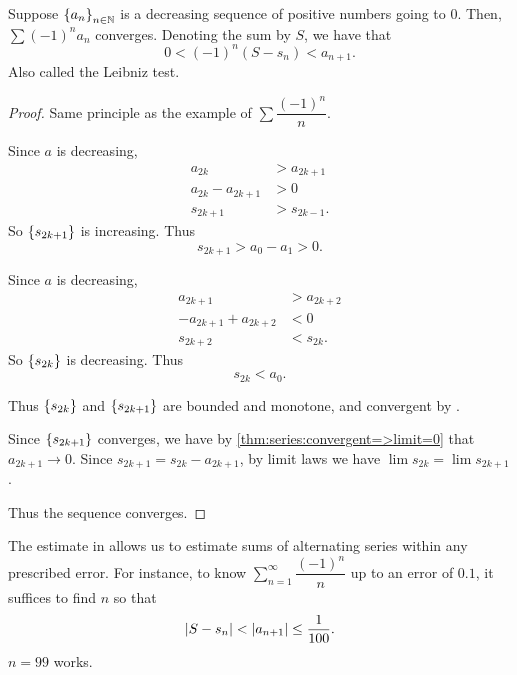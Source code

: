 \begin{thm} \label{thm:series:AST}
    Suppose $\set{a_{n}}_{n \in \N}$ is a decreasing sequence of positive numbers going to 0.
    Then, $\sum (-1)^{n} a_{n}$ converges.
    Denoting the sum by $S$, we have that \[
        0 < (-1)^{n}(S - s_{n}) < a_{n+1}.
    \] Also called the Leibniz test.
\end{thm}
\begin{proof}
    Same principle as the example of $\sum \dfrac{(-1)^{n}}{n}$.
    \begin{paracol}{2}
        \begin{leftcolumn}
            Since $a$ is decreasing,
            \begin{align*}
                a_{2k} &> a_{2k+1} \\
                a_{2k} - a_{2k+1} &> 0 \\
                s_{2k+1} &> s_{2k-1}.
            \end{align*}
            So $\set{s_{2k+1}}$ is increasing.
            Thus \[
                s_{2k + 1} > a_{0} - a_{1} > 0.
            \]
        \end{leftcolumn}
        
        \begin{rightcolumn}
            Since $a$ is decreasing,
            \begin{align*}
                a_{2k+1} &> a_{2k+2} \\
                - a_{2k+1} + a_{2k+2} &< 0 \\
                s_{2k+2} &< s_{2k}.
            \end{align*}
            So $\set{s_{2k}}$ is decreasing.
            Thus \[
                s_{2k} < a_{0}.
            \]
        \end{rightcolumn}
    \end{paracol}
    Thus $\set{s_{2k}}$ and $\set{s_{2k + 1}}$ are bounded and monotone, and convergent by .

    Since $\set{s_{2k + 1}}$ converges, we have by \cref{thm:series:convergent=>limit=0} that $a_{2k + 1} \to 0$.
    Since $s_{2k + 1} = s_{2k} - a_{2k + 1}$, by limit laws we have $\lim s_{2k} = \lim s_{2k + 1}$.

    Thus the sequence converges.
\end{proof}

\begin{rem}
    The estimate in  allows us to estimate sums of alternating series within any prescribed error.
    For instance, to know $\sum_{n=1}^{\infty} \dfrac{(-1)^{n}}{n}$ up to an error of $0.1$, it suffices to find $n$ so that \[
        \abs{S - s_{n}} < \abs{a_{n + 1}} \leq \frac{1}{100}.
    \] $n = 99$ works.
\end{rem}
